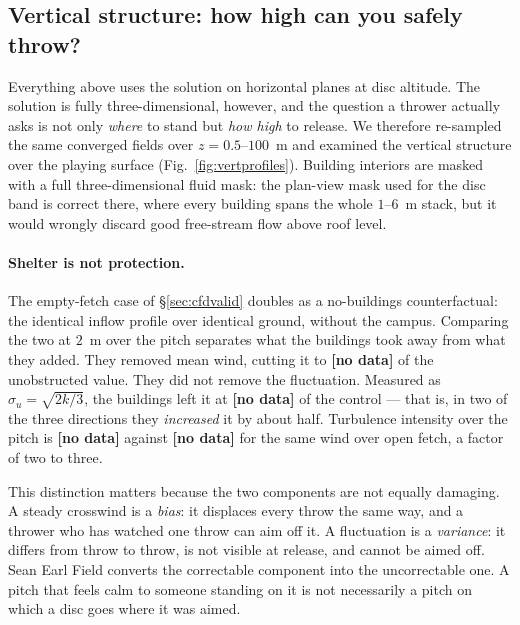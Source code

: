 \documentclass[11pt,letterpaper]{article}
\newcommand{\MISSINGNUM}{\textbf{\color{red}[no data]}}%
\newcommand{\VertUratioRange}{\MISSINGNUM}\newcommand{\VertSigRatioRange}{\MISSINGNUM}%
\newcommand{\VertTIpitchRange}{\MISSINGNUM}\newcommand{\VertTIcontrol}{\MISSINGNUM}%
\begin{document}
\subsection{Vertical structure: how high can you safely throw?}
\label{sec:vertical}

Everything above uses the solution on horizontal planes at disc altitude. The
solution is fully three-dimensional, however, and the question a thrower
actually asks is not only \emph{where} to stand but \emph{how high} to release.
We therefore re-sampled the same converged fields over $z = 0.5$--$100$~m and
examined the vertical structure over the playing surface
(Fig.~\ref{fig:vertprofiles}). Building interiors are masked with a full
three-dimensional fluid mask: the plan-view mask used for the disc band is
correct there, where every building spans the whole $1$--$6$~m stack, but it
would wrongly discard good free-stream flow above roof level.

\paragraph{Shelter is not protection.}
The empty-fetch case of \S\ref{sec:cfdvalid} doubles as a no-buildings
counterfactual: the identical inflow profile over identical ground, without the
campus. Comparing the two at $2$~m over the pitch separates what the buildings
took away from what they added. They removed mean wind, cutting it to
\VertUratioRange{} of the unobstructed value. They did not remove the
fluctuation. Measured as $\sigma_u = \sqrt{2k/3}$, the buildings left it at
\VertSigRatioRange{} of the control --- that is, in two of the three directions
they \emph{increased} it by about half. Turbulence intensity over the pitch is
\VertTIpitchRange{} against \VertTIcontrol{} for the same wind over open fetch,
a factor of two to three.

This distinction matters because the two components are not equally damaging.
A steady crosswind is a \emph{bias}: it displaces every throw the same way, and
a thrower who has watched one throw can aim off it. A fluctuation is a
\emph{variance}: it differs from throw to throw, is not visible at release, and
cannot be aimed off. Sean Earl Field converts the correctable component into
the uncorrectable one. A pitch that feels calm to someone standing on it is not
necessarily a pitch on which a disc goes where it was aimed.
\end{document}
